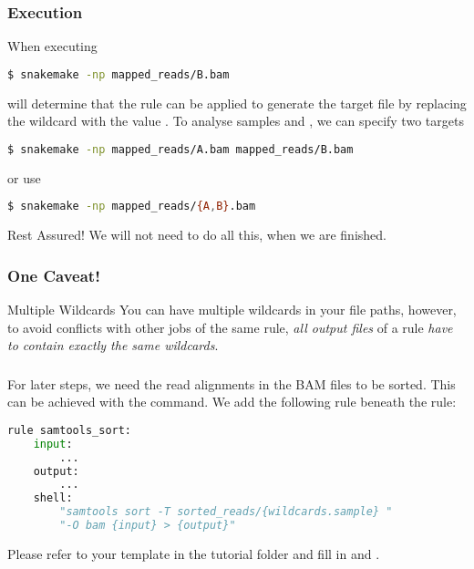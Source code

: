 \begin{frame}[fragile]
  \frametitle{Execution}
  When executing
  \begin{lstlisting}[language=Bash, style=Shell]
$ snakemake -np mapped_reads/B.bam
  \end{lstlisting}
  \Snakemake{} will determine that the rule  can be applied to generate the target file by replacing the wildcard  with the value .\newline
  To analyse samples  and , we can specify two targets
    \begin{lstlisting}[language=Bash, style=Shell]
$ snakemake -np mapped_reads/A.bam mapped_reads/B.bam
  \end{lstlisting}
  or use 
  \begin{lstlisting}[language=Bash, style=Shell]
$ snakemake -np mapped_reads/{A,B}.bam
  \end{lstlisting}
  \pause
  \begin{hint}{Rest Assured!}
  	We will not need to do all this, when we are finished.
  \end{hint}	
\end{frame}

\begin{frame}
	\frametitle{One Caveat!}
	\begin{alertblock}{Multiple Wildcards}
		You can have multiple wildcards in your file paths, however, to avoid conflicts with other jobs of the same rule, \emph{all output files} of a rule \emph{have to contain exactly the same wildcards}.
	\end{alertblock}
\end{frame}

\begin{frame}[fragile]
  \frametitle{}
  For later steps, we need the read alignments in the BAM files to be sorted. This can be achieved with the   command. We add the following rule beneath the  rule:
  \begin{lstlisting}[language=Python,style=Python]
rule samtools_sort:
    input:
        ...
    output:
        ...
    shell:
        "samtools sort -T sorted_reads/{wildcards.sample} "
        "-O bam {input} > {output}"
  \end{lstlisting}
  \begin{task}
  	Please refer to your template \newline {} in the tutorial folder and fill in  and .
  \end{task}
\end{frame}

